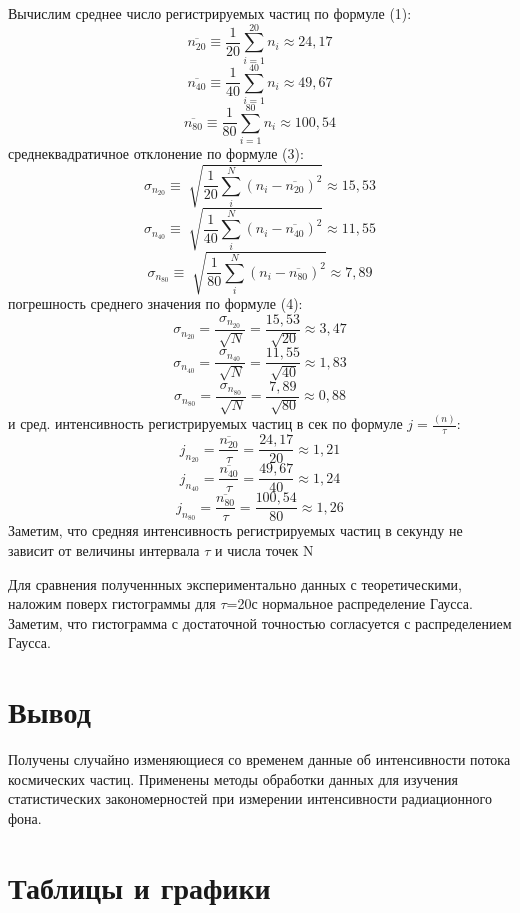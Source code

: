 \documentclass{article}
\begin{document}
\noindent
Вычислим среднее число регистрируемых частиц по формуле (1): 
$$\overline{n_{20}}\equiv\frac{1}{20}\sum_{i=1}^{20} {n_i}\approx24,17$$
$$\overline{n_{40}}\equiv\frac{1}{40}\sum_{i=1}^{40} {n_i}\approx49,67$$
$$\overline{n_{80}}\equiv\frac{1}{80}\sum_{i=1}^{80} {n_i}\approx100,54$$
среднеквадратичное отклонение по формуле (3):
$$\sigma_{n_{20}}\equiv\sqrt[]{\frac{1}{20}\sum_{i}^{N} {(n_i-\overline{n_{20}})^2}}\approx15,53$$
$$\sigma_{n_{40}}\equiv\sqrt[]{\frac{1}{40}\sum_{i}^{N} {(n_i-\overline{n_{40}})^2}}\approx11,55$$
$$\sigma_{n_{80}}\equiv\sqrt[]{\frac{1}{80}\sum_{i}^{N} {(n_i-\overline{n_{80}})^2}}\approx7,89$$
погрешность среднего значения по формуле (4):
$$\sigma_{n_{20}}=\frac{\sigma_{n_{20}}}{\sqrt[]{N}}=\frac{15,53}{\sqrt[]{20}}\approx3,47$$
$$\sigma_{n_{40}}=\frac{\sigma_{n_{40}}}{\sqrt[]{N}}=\frac{11,55}{\sqrt[]{40}}\approx1,83$$
$$\sigma_{n_{80}}=\frac{\sigma_{n_{80}}}{\sqrt[]{N}}=\frac{7,89}{\sqrt[]{80}}\approx0,88$$
и сред. интенсивность регистрируемых частиц в сек по формуле $j=\frac{(n)}{\tau}$:
$$j_{n_{20}}=\frac{\overline{n_{20}}}{\tau}=\frac{24,17}{20}\approx1,21$$
$$j_{n_{40}}=\frac{\overline{n_{40}}}{\tau}=\frac{49,67}{40}\approx1,24$$
$$j_{n_{80}}=\frac{\overline{n_{80}}}{\tau}=\frac{100,54}{80}\approx1,26$$
Заметим, что средняя интенсивность регистрируемых частиц в секунду не зависит от величины интервала $\tau$ и числа точек N

\noindent
Для сравнения полученнных экспериментально данных с теоретическими, наложим поверх гистограммы для $\tau$=20с нормальное распределение Гаусса. Заметим, что гистограмма с достаточной точностью согласуется с распределением Гаусса.

\section*{Вывод}
Получены случайно изменяющиеся со временем данные об интенсивности потока космических частиц. Применены методы обработки данных для изучения статистических закономерностей при измерении интенсивности радиационного фона.


\newpage


\section*{Таблицы и графики}
\end{document}
